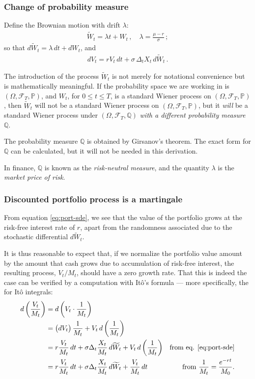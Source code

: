 \documentclass[12pt]{article}
\newcommand{\sF}{\mathcal{F}}
\newcommand{\PP}{\mathbb{P}}
\newcommand{\PQ}{\mathbb{Q}}
\begin{document}
\subsubsection{Change of probability measure}

Define the Brownian motion with drift $\lambda$:
\begin{align}\label{eq:wiener-drift}
\widetilde{W}_t = \lambda t + W_t\,, \quad \lambda = \frac{\mu - r}{\sigma}\,;
\end{align}
so that $d\widetilde{W}_t = \lambda \, dt + dW_t$, and
\begin{align}\label{eq:port-sde}
dV_t = rV_t \, dt + \sigma \, \Delta_t X_t \,  d\widetilde{W}_t\,.
\end{align}

The introduction of the process $\widetilde{W}_t$
is not merely for notational convenience but is mathematically
meaningful.  If the probability space we are working in
is $(\Omega, \sF_T, \PP)$,
and $W_t$, for $0 \leq t \leq T$, is a 
standard Wiener process on $(\Omega, \sF_T, \PP)$,
then $\widetilde{W}_t$ will not be a standard Wiener process
on $(\Omega, \sF_T, \PP)$, but it \emph{will} be a standard Wiener process
under $(\Omega, \sF_T, \PQ)$ \emph{with a different probability measure} 
$\PQ$.

The probability measure $\PQ$ is obtained by Girsanov's theorem.
The exact form for $\PQ$ can be calculated,
but it will not be needed in this derivation.

In finance, $\PQ$ is known as the \emph{risk-neutral measure},
and the quantity $\lambda$ is the \emph{market price of risk}.

\subsubsection{Discounted portfolio process is a martingale}

From equation \eqref{eq:port-sde},
we see that the value of the portfolio grows at the risk-free
interest rate of $r$,
apart from the randomness associated due to the stochastic
differential $d\widetilde{W}_t$.

It is thus reasonable to expect that,
if we normalize the portfolio value amount
by the amount that cash grows due to accumulation of risk-free
interest,
the resulting process, $V_t/M_t$, should have a zero growth rate.
That this is indeed the case can be verified
by a computation with It\^o's formula
--- more specifically, the 
 for It\^o integrals:
\begin{align*}
d \left( \frac{V_t}{M_t} \right)
&= d \left(V_t \cdot \frac{1}{M_t} \right) \\
&= \bigl( d V_t \bigr) \, \frac{1}{M_t} + 
V_t \, d \left( \frac{1}{M_t}\right) 
\\
&= r \frac{V_t}{M_t} \, dt + \sigma \Delta_t \frac{X_t}{M_t} \, d\widetilde{W}_t+
V_t \, d \left( \frac{1}{M_t}\right) & \text{from eq. \eqref{eq:port-sde}}
\\
&= r \frac{V_t}{M_t} \, dt + \sigma \Delta_t \frac{X_t}{M_t} \, d\widetilde{W}_t+
\frac{V_t}{M_t} \, dt
& \text{from $\frac{1}{M_t} = \frac{e^{-rt}}{M_0}$.}
\end{align*}
\end{document}
